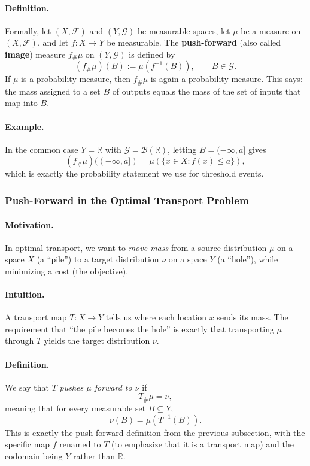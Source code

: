 \paragraph{Definition.}
Formally, let $(X,\mathcal{F})$ and $(Y,\mathcal{G})$ be measurable spaces, let $\mu$ be a measure on $(X,\mathcal{F})$,
and let $f:X\to Y$ be measurable. The \textbf{push-forward} (also called \textbf{image}) measure $f_{\#}\mu$ on
$(Y,\mathcal{G})$ is defined by
$$
(f_{\#}\mu)(B) := \mu(f^{-1}(B)), \qquad B\in\mathcal{G}.
$$
If $\mu$ is a probability measure, then $f_{\#}\mu$ is again a probability measure.
This says: the mass assigned to a set $B$ of outputs equals the mass of the set of inputs that map into $B$.

\paragraph{Example.}
In the common case $Y=\mathbb{R}$ with $\mathcal{G}=\mathcal{B}(\mathbb{R})$, letting $B=(-\infty,a]$ gives
$$
(f_{\#}\mu)((-\infty,a]) = \mu(\{x\in X : f(x)\le a\}),
$$
which is exactly the probability statement we use for threshold events.

\subsubsection{Push-Forward in the Optimal Transport Problem}
\paragraph{Motivation.}
In optimal transport, we want to \emph{move mass} from a source distribution $\mu$ on a space $X$ (a ``pile'')
to a target distribution $\nu$ on a space $Y$ (a ``hole''), while minimizing a cost (the objective).

\paragraph{Intuition.}
A transport map $T:X\to Y$ tells us where each location $x$ sends its mass. The requirement that ``the pile becomes
the hole'' is exactly that transporting $\mu$ through $T$ yields the target distribution $\nu$.

\paragraph{Definition.}
We say that $T$ \emph{pushes $\mu$ forward to $\nu$} if
$$
T_{\#}\mu=\nu,
$$
meaning that for every measurable set $B\subseteq Y$,
$$
\nu(B)=\mu(T^{-1}(B)).
$$
This is exactly the push-forward definition from the previous subsection, with the specific map $f$ renamed to $T$
(to emphasize that it is a transport map) and the codomain being $Y$ rather than $\mathbb{R}$.

